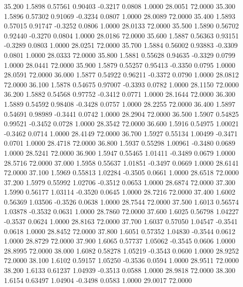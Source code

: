   35.200   1.5898   0.57561   0.90403  -0.3217   0.0808   1.0000  28.0051  72.0000
  35.300   1.5896   0.57302   0.91069  -0.3234   0.0807   1.0000  28.0089  72.0000
  35.400   1.5893   0.57015   0.91747  -0.3252   0.0806   1.0000  28.0133  72.0000
  35.500   1.5890   0.56702   0.92440  -0.3270   0.0804   1.0000  28.0186  72.0000
  35.600   1.5887   0.56363   0.93151  -0.3289   0.0803   1.0000  28.0251  72.0000
  35.700   1.5884   0.56002   0.93883  -0.3309   0.0801   1.0000  28.0333  72.0000
  35.800   1.5881   0.55628   0.94635  -0.3329   0.0799   1.0000  28.0441  72.0000
  35.900   1.5879   0.55257   0.95413  -0.3350   0.0795   1.0000  28.0591  72.0000
  36.000   1.5877   0.54922   0.96211  -0.3372   0.0790   1.0000  28.0812  72.0000
  36.100   1.5878   0.54675   0.97007  -0.3393   0.0782   1.0000  28.1150  72.0000
  36.200   1.5882   0.54568   0.97752  -0.3412   0.0771   1.0000  28.1644  72.0000
  36.300   1.5889   0.54592   0.98408  -0.3428   0.0757   1.0000  28.2255  72.0000
  36.400   1.5897   0.54691   0.98989  -0.3441   0.0742   1.0000  28.2904  72.0000
  36.500   1.5907   0.54825   0.99521  -0.3452   0.0728   1.0000  28.3542  72.0000
  36.600   1.5916   0.54975   1.00021  -0.3462   0.0714   1.0000  28.4149  72.0000
  36.700   1.5927   0.55134   1.00499  -0.3471   0.0701   1.0000  28.4718  72.0000
  36.800   1.5937   0.55298   1.00961  -0.3480   0.0689   1.0000  28.5241  72.0000
  36.900   1.5947   0.55465   1.01411  -0.3489   0.0679   1.0000  28.5716  72.0000
  37.000   1.5958   0.55637   1.01851  -0.3497   0.0669   1.0000  28.6141  72.0000
  37.100   1.5969   0.55813   1.02284  -0.3505   0.0661   1.0000  28.6518  72.0000
  37.200   1.5979   0.55992   1.02706  -0.3512   0.0653   1.0000  28.6874  72.0000
  37.300   1.5990   0.56177   1.03114  -0.3520   0.0645   1.0000  28.7216  72.0000
  37.400   1.6002   0.56369   1.03506  -0.3526   0.0638   1.0000  28.7544  72.0000
  37.500   1.6013   0.56574   1.03878  -0.3532   0.0631   1.0000  28.7860  72.0000
  37.600   1.6025   0.56798   1.04227  -0.3537   0.0624   1.0000  28.8163  72.0000
  37.700   1.6037   0.57050   1.04547  -0.3541   0.0618   1.0000  28.8452  72.0000
  37.800   1.6051   0.57352   1.04830  -0.3544   0.0612   1.0000  28.8729  72.0000
  37.900   1.6065   0.57737   1.05062  -0.3545   0.0606   1.0000  28.8995  72.0000
  38.000   1.6082   0.58278   1.05219  -0.3543   0.0600   1.0000  28.9252  72.0000
  38.100   1.6102   0.59157   1.05250  -0.3536   0.0594   1.0000  28.9511  72.0000
  38.200   1.6133   0.61237   1.04939  -0.3513   0.0588   1.0000  28.9818  72.0000
  38.300   1.6154   0.63497   1.04904  -0.3498   0.0583   1.0000  29.0017  72.0000
